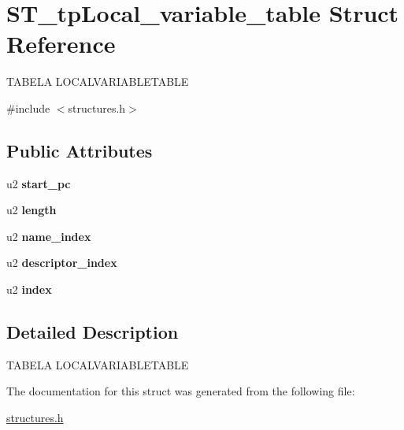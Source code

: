 \hypertarget{structST__tpLocal__variable__table}{}\section{S\+T\+\_\+tp\+Local\+\_\+variable\+\_\+table Struct Reference}
\label{structST__tpLocal__variable__table}




 T\+A\+B\+E\+LA L\+O\+C\+A\+L\+V\+A\+R\+I\+A\+B\+L\+E\+T\+A\+B\+LE  




{\ttfamily \#include $<$structures.\+h$>$}

\subsection*{Public Attributes}
\begin{DoxyCompactItemize}
\item 
\mbox{\label{structST__tpLocal__variable__table_a0ba0597c22af7f1c13dd6ea140846fff}} 
u2 {\bfseries start\+\_\+pc}
\item 
\mbox{\label{structST__tpLocal__variable__table_a4da5171b3a76b7b2715c27dc2c1c7e1a}} 
u2 {\bfseries length}
\item 
\mbox{\label{structST__tpLocal__variable__table_adb7c97d8002b8c53cc796c3a2afc079a}} 
u2 {\bfseries name\+\_\+index}
\item 
\mbox{\label{structST__tpLocal__variable__table_a9a68c2c6dba0e9837aa608035ba313fd}} 
u2 {\bfseries descriptor\+\_\+index}
\item 
\mbox{\label{structST__tpLocal__variable__table_a250463c586f91ffd0241ebec6ed30330}} 
u2 {\bfseries index}
\end{DoxyCompactItemize}


\subsection{Detailed Description}


 T\+A\+B\+E\+LA L\+O\+C\+A\+L\+V\+A\+R\+I\+A\+B\+L\+E\+T\+A\+B\+LE 

The documentation for this struct was generated from the following file\+:\begin{DoxyCompactItemize}
\item 
\mbox{\hyperlink{structures_8h}{structures.\+h}}\end{DoxyCompactItemize}
